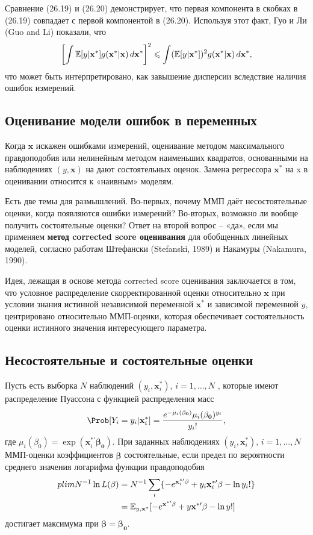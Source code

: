 Сравнение (26.19) и (26.20) демонстрирует, что первая компонента в скобках в (26.19) совпадает с первой компонентой в (26.20). Используя этот факт, Гуо и Ли (Guo and Li) показали, что
\begin{equation}
 \left[ \int \mathbb{E}[y| \mathbf{x^*}]g(\mathbf{x^*|x})\, d\mathbf{x^*} \right]^2 \leqslant \int (\mathbb{E}[y| \mathbf{x^*}])^2 g(\mathbf{x^*|x})\, d\mathbf{x^*},
\end{equation}
что может быть интерпретировано, как завышение дисперсии вследствие наличия ошибок измерений.

\subsection*{Оценивание модели ошибок в переменных} 
Когда $\mathbf{x}$ искажен ошибками измерений, оценивание методом максимального правдоподобия или нелинейным методом наименьших квадратов, основанными на наблюдениях $(y, \mathbf{x})$ на дают состоятельных оценок. Замена  регрессора $\mathbf{x^*}$ на x в оценивании относится к «наивным» моделям.

Есть две темы для размышлений. Во-первых, почему ММП даёт несостоятельные оценки, когда появляются ошибки измерений? Во-вторых, возможно ли вообще получить состоятельные оценки? Ответ на второй вопрос – «да», если мы применяем {\bf метод corrected score оценивания} для обобщенных линейных моделей, согласно работам Штефански (Stefanski, 1989) и Накамуры (Nakamura, 1990). 

Идея, лежащая в основе метода corrected score оценивания заключается в том, что условное распределение скорректированной оценки относительно $\mathbf{x}$ при условии знания истинной независимой переменной $\mathbf{x^*}$ и зависимой переменной $y$, центрировано относительно ММП-оценки, которая обеспечивает состоятельность оценки истинного значения интересующего параметра.

\subsection*{Несостоятельные и состоятельные оценки} 
Пусть есть выборка $N$ наблюдений $(y_i, \mathbf{x}^*_i), \, i=1, \dots,N$ , которые имеют распределение Пуассона с функцией распределения масс
\[
\Prob[Y_i=y_i|\mathbf{x}^*_i]=\frac{e^{-\mu_i(\mathbf{\beta_0})}\mu_i(\mathbf{\beta_0})^{y_i}}{y_i!},
\]
где $\mu_i(\beta_0)=\exp(\mathbf{x}^{*\prime}_i \mathbf{\beta_0})$. При заданных наблюдениях $(y_i, \mathbf{x}^*_i), \, i=1, \dots,N$ ММП-оценки коэффициентов $\mathbf{\widehat{\beta}}$ состоятельные, если предел по вероятности среднего значения логарифма функции правдоподобия
\begin{align}
plim N^{-1}\ln L(\mathbf{\beta})&=N^{-1} \sum \limits_i \{ -e^{\mathbf{x}^{*\prime}_i \mathbf{\beta}} + y_i \mathbf{x}^{*\prime}_i \mathbf{\beta} - \ln y_i! \} \notag \\
&= \mathbb{E}_{y,\mathbf{x^*}}[-e^{\mathbf{x^{*\prime}} \mathbf{\beta}} + y \mathbf{x^{*\prime}} \mathbf{\beta} - \ln y! ]
\end{align}
достигает максимума при $\mathbf{\beta} = \mathbf{\beta_0}$.


